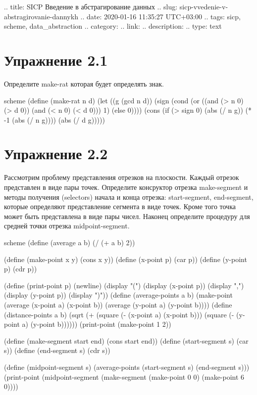 .. title: SICP Введение в абстрагирование данных
.. slug: sicp-vvedenie-v-abstragirovanie-dannykh
.. date: 2020-01-16 11:35:27 UTC+03:00
.. tags: sicp, scheme, data_abstraction
.. category: 
.. link: 
.. description: 
.. type: text


\chapter{Упражнение 2.1}

Определите make-rat которая будет определять знак.

\begin{codelisting}{scheme}
(define (make-rat n d)
  (let ((g (gcd n d))
        (sign (cond (or ((and (> n 0) (> d 0)) (and (< n 0) (< d 0))) 1)
                        (else 0))))
    (cons
     (if (> sign 0) (abs (/ n g)) (* -1 (abs (/ n g))))
     (abs (/ d g)))))
\end{codelisting}

\chapter{Упражнение 2.2}

Рассмотрим проблему представления отрезков на плоскости. Каждый отрезок представлен в виде пары точек. Определите консруктор отрезка make-segment и методы получения (selectors) начала и конца отрезка: start-segment, end-segment, которые определяют представление сегмента в виде точек. Кроме того точка может быть представлена в виде пары чисел. Наконец определите процедуру для средней точки отрезка midpoint-segment.

\begin{codelisting}{scheme}
(define (average a b) (/ (+ a b) 2))

(define (make-point x y) (cons x y))
(define (x-point p) (car p))
(define (y-point p) (cdr p))

(define (print-point p)
  (newline)
  (display "(")
  (display (x-point p))
  (display ",")
  (display (y-point p))
  (display ")"))
(define (average-points a b)
   (make-point (average (x-point a) (x-point b))
               (average (y-point a) (y-point b))))
(define (distance-points a b)
  (sqrt (+ (square (- (x-point a) (x-point b)))
           (square (- (y-point a) (y-point b))))))
(print-point (make-point 1 2))

(define (make-segment start end) (cons start end))
(define (start-segment s) (car s))
(define (end-segment s) (cdr s))

(define (midpoint-segment s) (average-points (start-segment s) (end-segment s)))
(print-point (midpoint-segment (make-segment (make-point 0 0) (make-point 6 0))))
\end{codelisting}



